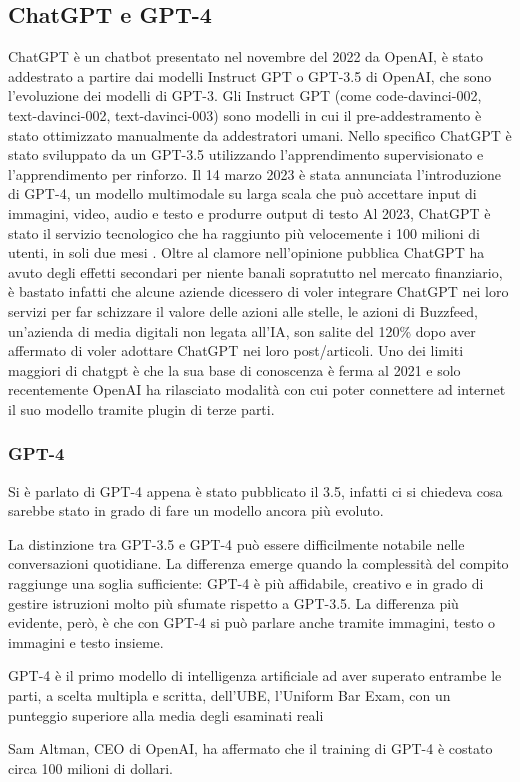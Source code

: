 \subsection[ChatGPT e GPT4]{ChatGPT e GPT-4}

ChatGPT è un chatbot presentato nel novembre del 2022 da OpenAI, è stato addestrato a partire dai modelli Instruct GPT o GPT-3.5 di OpenAI, che sono l'evoluzione dei modelli di GPT-3. Gli Instruct GPT (come code-davinci-002, text-davinci-002, text-davinci-003) sono modelli in cui il pre-addestramento è stato ottimizzato manualmente da addestratori umani. Nello specifico ChatGPT è stato sviluppato da un GPT-3.5 utilizzando l'apprendimento supervisionato e l'apprendimento per rinforzo. Il 14 marzo 2023 è stata annunciata l'introduzione di GPT-4, un modello multimodale su larga scala che può accettare input di immagini, video, audio e testo e produrre output di testo
Al 2023, ChatGPT è stato il servizio tecnologico che ha raggiunto più velocemente i 100 milioni di utenti, in soli due mesi \cite{chat100}.
Oltre al clamore nell'opinione pubblica ChatGPT ha avuto degli effetti secondari per niente banali sopratutto nel mercato finanziario, è bastato infatti che alcune aziende dicessero di voler integrare ChatGPT nei loro servizi per far schizzare il valore delle azioni alle stelle, le azioni di Buzzfeed, un'azienda di media digitali non legata all'IA, son salite del 120\% \cite{buzz120} dopo aver affermato di voler adottare ChatGPT nei loro post/articoli.
Uno dei limiti maggiori di chatgpt è che la sua base di conoscenza è ferma al 2021 e solo recentemente OpenAI ha rilasciato modalità con cui poter connettere ad internet il suo modello tramite plugin di terze parti.

\subsubsection{GPT-4}
Si è parlato di GPT-4 appena è stato pubblicato il 3.5, infatti ci si chiedeva cosa sarebbe stato in grado di fare un modello ancora più evoluto.

La distinzione tra GPT-3.5 e GPT-4 può essere difficilmente notabile nelle conversazioni quotidiane. La differenza emerge quando la complessità del compito raggiunge una soglia sufficiente: GPT-4 è più affidabile, creativo e in grado di gestire istruzioni molto più sfumate rispetto a GPT-3.5. 
La differenza più evidente, però, è che con GPT-4 si può parlare anche tramite immagini, testo o immagini e testo insieme.

GPT-4 è il primo modello di intelligenza artificiale ad aver superato entrambe le parti, a scelta multipla e scritta, dell'UBE, l'Uniform Bar Exam, con un punteggio superiore alla media degli esaminati reali \cite{gpt4bar}

Sam Altman, CEO di OpenAI, ha affermato che il training di GPT-4 è costato circa 100 milioni di dollari.